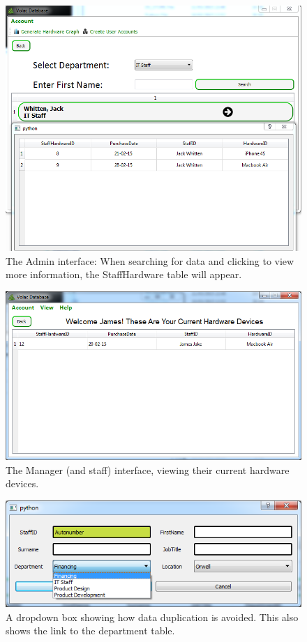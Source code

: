\begin{figure}[H]
    \includegraphics[width=\textwidth]{./Evaluation/Images/database3.png}
    \caption{The Admin interface: When searching for data and clicking to view more information, the StaffHardware table will appear.} \label{fig:db2}
\end{figure}

\begin{figure}[H]
    \includegraphics[width=\textwidth]{./Evaluation/Images/database2.png}
    \caption{The Manager (and staff) interface, viewing their current hardware devices.} \label{fig:db3}
\end{figure}

\begin{figure}[H]
    \includegraphics[width=\textwidth]{./Evaluation/Images/dropdown.png}
    \caption{A dropdown box showing how data duplication is avoided. This also shows the link to the department table.} 
\end{figure}



